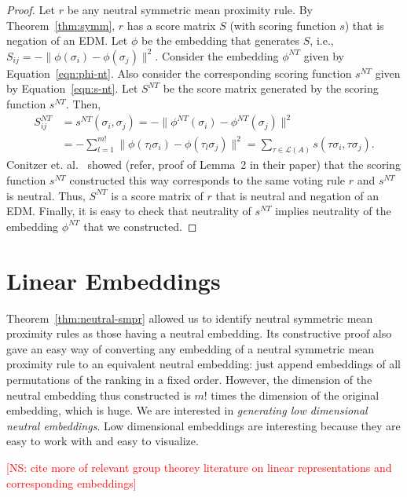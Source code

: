 \documentclass[10pt,letterpaper]{article}
\newcommand{\calL}{{\mathcal{L}}}
\newcommand{\rank}{{\calL(A)}}
\newcommand{\kibitz}[2]{\ifnum\Comments=1\textcolor{#1}{#2}\fi}
\newcommand{\cns}[1]{\kibitz{red} {[NS: #1]}}
\newcommand{\nt}{NT}
\begin{document}
\begin{proof}
Let $r$ be any neutral symmetric mean proximity rule. By Theorem~\ref{thm:symm}, $r$ has a score matrix $S$ (with scoring function $s$) that is negation of an EDM. Let $\phi$ be the embedding that generates $S$, i.e., $S_{ij} = -\|\phi(\sigma_i)-\phi(\sigma_j)\|^2$. Consider the embedding $\phi^{\nt}$ given by Equation~\eqref{eqn:phi-nt}. Also consider the corresponding scoring function $s^{\nt}$ given by Equation~\eqref{eqn:s-nt}. Let $S^{\nt}$ be the score matrix generated by the scoring function $s^{\nt}$. Then, 
\begin{align*}
S^{\nt}_{ij} &= s^{\nt}(\sigma_i,\sigma_j) = -\|\phi^{\nt}(\sigma_i)-\phi^{\nt}(\sigma_j)\|^2 \\
&= - \sum_{l=1}^{m!} \|\phi(\tau_l \sigma_i)-\phi(\tau_l \sigma_j)\|^2 = \sum_{\tau \in \rank} s(\tau \sigma_i, \tau \sigma_j).
\end{align*}
Conitzer et. al.~\cite{CRX09} showed (refer, proof of Lemma~2 in their paper) that the scoring function $s^{\nt}$ constructed this way corresponds to the same voting rule $r$ and $s^{\nt}$ is neutral. Thus, $S^{\nt}$ is a score matrix of $r$ that is neutral and negation of an EDM. Finally, it is easy to check that neutrality of $s^{\nt}$ implies neutrality of the embedding $\phi^{\nt}$ that we constructed.
\end{proof}


\section{Linear Embeddings}

Theorem~\ref{thm:neutral-smpr} allowed us to identify neutral symmetric mean proximity rules as those having a neutral embedding. %
Its constructive proof also gave an easy way of converting any embedding of a neutral symmetric mean proximity rule to an equivalent neutral embedding: just append embeddings of all permutations of the ranking in a fixed order. However, the dimension of the neutral embedding thus constructed is $m!$ times the dimension of the original embedding, which is huge. We are interested in \emph{generating low dimensional neutral embeddings}. Low dimensional embeddings are interesting because they are easy to work with and easy to visualize. 

\cns{cite more of relevant group theorey literature on linear representations and corresponding embeddings}
\end{document}
